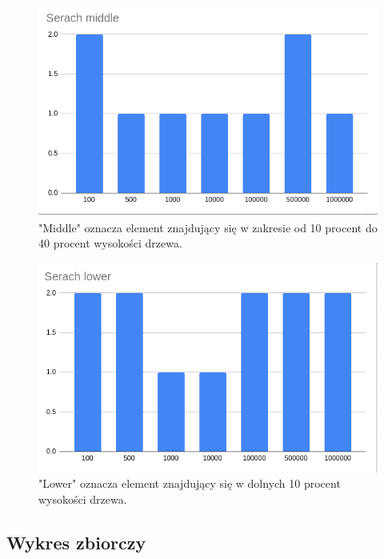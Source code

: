 \documentclass{article}
\begin{document}
\begin{figure}[H]
    \centering
    \includegraphics[width=\textwidth]{"../assets/4_4.png"}
    \caption{"Middle" oznacza element znajdujący się w zakresie od 10 procent do 40 procent wysokości drzewa. }
    \label{fig:4_4}
\end{figure}

\begin{figure}[H]
    \centering
    \includegraphics[width=\textwidth]{"../assets/4_5.png"}
    \caption{"Lower" oznacza element znajdujący się w dolnych 10 procent wysokości drzewa.}
    \label{fig:4_5}

\end{figure}

\subsection*{Wykres zbiorczy}
\end{document}
